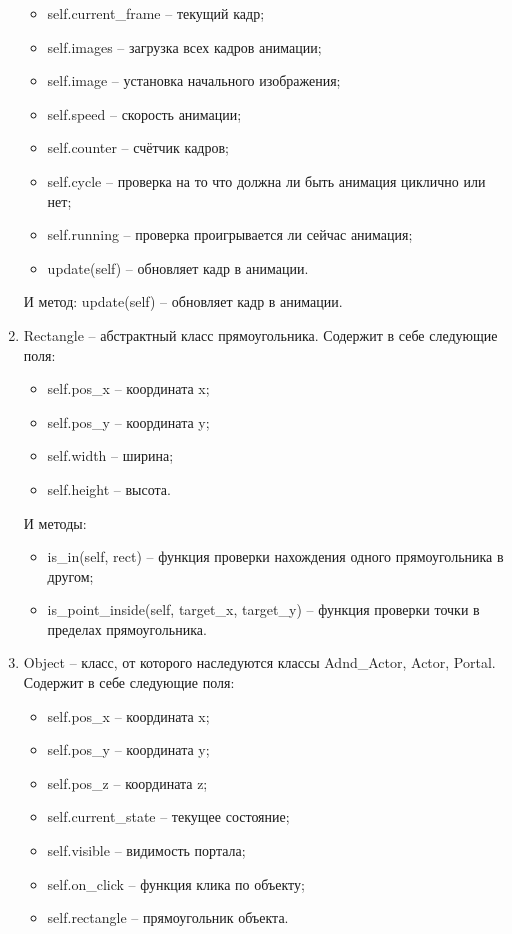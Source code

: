 \begin{enumerate}
\begin{itemize}
			\item self.current\_frame -- текущий кадр;
			\item self.images  -- загрузка всех кадров анимации;
			\item self.image -- установка начального изображения;
			\item self.speed -- скорость анимации;
			\item self.counter -- счётчик кадров;
			\item self.cycle -- проверка на то что должна ли быть анимация циклично или нет;
			\item self.running -- проверка проигрывается ли сейчас анимация;
			\item update(self) -- обновляет кадр в анимации.
		\end{itemize}
		И метод: update(self) -- обновляет кадр в анимации.
	\item Rectangle -- абстрактный класс прямоугольника. Содержит в себе следующие поля:
		\begin{itemize}
			\item self.pos\_x -- координата x;
			\item self.pos\_y -- координата y;
			\item self.width -- ширина;
			\item self.height -- высота.
		\end{itemize}
		И методы:
		\begin{itemize}
			\item is\_in(self, rect) -- функция проверки нахождения одного прямоугольника в другом;
			\item is\_point\_inside(self, target\_x, target\_y) -- функция проверки точки в пределах прямоугольника.
		\end{itemize}
	\item Object -- класс, от которого наследуются классы Adnd\_Actor, Actor, Portal. Содержит в себе следующие поля:
		\begin{itemize}
			\item self.pos\_x -- координата x;
			\item self.pos\_y -- координата y;
			\item self.pos\_z -- координата z;
			\item self.current\_state -- текущее состояние;
			\item self.visible -- видимость портала;
			\item self.on\_click -- функция клика по объекту;
			\item self.rectangle -- прямоугольник объекта.

\end{itemize}
\end{enumerate}
